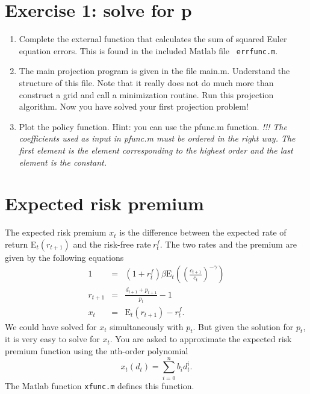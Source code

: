 \documentclass{article}
\begin{document}
\section{Exercise 1: solve for p}

\begin{enumerate}
\item Complete the external function that calculates the sum of squared
Euler equation errors. This is found in the included Matlab file \texttt{%
errfunc.m}.

\item The main projection program is given in the file main.m. Understand
the structure of this file. Note that it really does not do much more than
construct a grid and call a minimization routine. Run this projection
algorithm. Now you have solved your first projection problem!

\item Plot the policy function. Hint: you can use the pfunc.m function.%
\newline
\emph{!!! The coefficients used as input in pfunc.m must be ordered in the
right way. The first element is the element corresponding to the highest
order and the last element is the constant.}
\end{enumerate}

\section{Expected risk premium}

The expected risk premium $x_{t}$ is the difference between the expected
rate of return E$_{t}\left( r_{t+1}\right) $ and the risk-free rate$%
~r_{t}^{f}$. The two rates and the premium are given by the following
equations%
\begin{eqnarray*}
1 &=&\left( 1+r_{t}^{f}\right) \beta \text{E}_{t}\left( \left( \frac{c_{t+1}%
}{c_{t}}\right) ^{-\gamma }\right) \\
r_{t+1} &=&\frac{d_{t+1}+p_{t+1}}{p_{t}}-1 \\
x_{t} &=&\text{E}_{t}\left( r_{t+1}\right) -r_{t}^{f}\text{.}
\end{eqnarray*}%
We could have solved for $x_{t}$ simultaneously with $p_{t}$. But given the
solution for $p_{t}$, it is very easy to solve for $x_{t}$. You are asked to
approximate the expected risk premium function using the nth-order polynomial%
\begin{equation*}
x_{t}\left( d_{t}\right) =\sum_{i=0}^{n}b_{i}d_{t}^{i}\text{.}
\end{equation*}%
The Matlab function \texttt{xfunc.m} defines this function.
\end{document}
